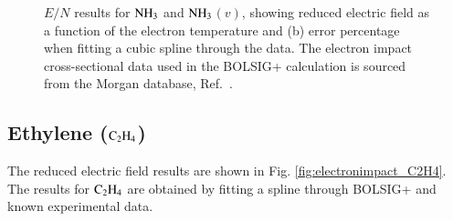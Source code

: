 \begin{figure}[!htbp]
\centering
{}
\caption{$E/N$ results for $\rm NH_3$ and $\rm NH_3$$(v)$, showing reduced electric field as a function of the electron temperature and (b) error percentage when fitting a cubic spline through the data. The electron impact cross-sectional data used in the BOLSIG+ calculation is sourced from the Morgan database, Ref.\ \cite{lxc:2024:morgan}.}
\label{fig:electronimpact_6}
\end{figure}
%
\subsection{Ethylene ($\rm C_2H_4$)}

The reduced electric field results are shown in Fig. \ref{fig:electronimpact_C2H4}. The results for $\rm C_2H_4$ are obtained by fitting a spline through BOLSIG+ and known experimental data.

